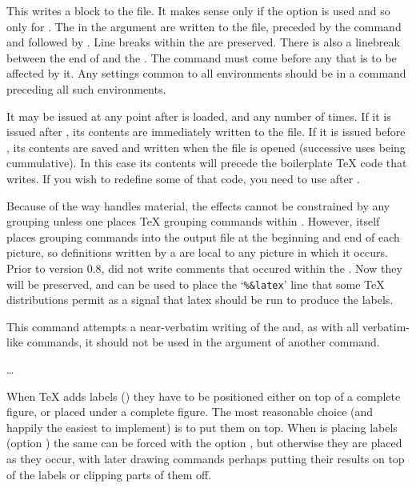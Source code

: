 \documentclass[letterpaper]{article}
\begin{document}
This writes a  block to the  file. It makes
sense only if the  option is used and so only for \MP{}.
The  in the argument are written to the 
file, preceded by the \MP{} command  and followed by
. Line breaks within the  are preserved.
There is also a linebreak between the end of  and the
. The  command must come before any 
that is to be affected by it. Any settings common to all 
environments should be in a  command preceding all such
environments.

It may be issued at any point after \mfp{} is loaded, and any number of
times. If it is issued after , its contents are
immediately written to the  file. If it is issued before
, its contents are saved and written when the file is
opened (successive uses being cummulative). In this case its contents
will precede the boilerplate \TeX{} code that \mfp{} writes. If you wish
to redefine some of that code, you need to use  after
.

Because of the way \MP{} handles  material, the effects
cannot be constrained by any grouping unless one places \TeX{} grouping
commands within . However, \mfp{} itself places
grouping commands into the output file at the beginning and end of each
picture, so definitions written by a  are local to any
picture in which it occurs.  Prior to version 0.8, \mfp{} did not write
comments that occured within the . Now they will be
preserved, and can be used to place the `\verb$%&latex$' line that some
\TeX{} distributions permit as a signal that latex should be run to
produce the labels.

This command attempts a near-verbatim writing of the 
and, as with all verbatim-like commands, it should not be used in the
argument of another command.

\begin{cd}
 \dots {}%
%
\end{cd}

When \TeX{} adds labels () they have to be positioned
either on top of a complete figure, or placed under a complete figure.
The most reasonable choice (and happily the easiest to implement) is to
put them on top. When \MP{} is placing labels (option ) the
same can be forced with the option , but otherwise
they are placed as they occur, with later drawing commands perhaps
putting their results on top of the labels or clipping parts of them off.
\end{document}
